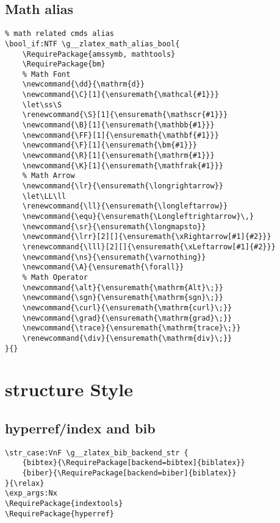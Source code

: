 \subsection{Math alias}
\begin{verbatim}
% math related cmds alias
\bool_if:NTF \g__zlatex_math_alias_bool{
    \RequirePackage{amssymb, mathtools}
    \RequirePackage{bm}          
    % Math Font 
    \newcommand{\dd}{\mathrm{d}}
    \newcommand{\C}[1]{\ensuremath{\mathcal{#1}}}
    \let\ss\S
    \renewcommand{\S}[1]{\ensuremath{\mathscr{#1}}}
    \newcommand{\B}[1]{\ensuremath{\mathbb{#1}}}
    \newcommand{\FF}[1]{\ensuremath{\mathbf{#1}}}
    \newcommand{\F}[1]{\ensuremath{\bm{#1}}}
    \newcommand{\R}[1]{\ensuremath{\mathrm{#1}}}
    \newcommand{\K}[1]{\ensuremath{\mathfrak{#1}}}
    % Math Arrow 
    \newcommand{\lr}{\ensuremath{\longrightarrow}}
    \let\LL\ll
    \renewcommand{\ll}{\ensuremath{\longleftarrow}}
    \newcommand{\equ}{\ensuremath{\Longleftrightarrow}\,}
    \newcommand{\sr}{\ensuremath{\longmapsto}}
    \newcommand{\lrr}[2][]{\ensuremath{\xRightarrow[#1]{#2}}}
    \renewcommand{\lll}[2][]{\ensuremath{\xLeftarrow[#1]{#2}}}
    \newcommand{\ns}{\ensuremath{\varnothing}}
    \newcommand{\A}{\ensuremath{\forall}}
    % Math Operator
    \newcommand{\alt}{\ensuremath{\mathrm{Alt}\;}}
    \newcommand{\sgn}{\ensuremath{\mathrm{sgn}\;}}
    \newcommand{\curl}{\ensuremath{\mathrm{curl}\;}}
    \newcommand{\grad}{\ensuremath{\mathrm{grad}\;}}
    \newcommand{\trace}{\ensuremath{\mathrm{trace}\;}}
    \renewcommand{\div}{\ensuremath{\mathrm{div}\;}}
}{}
\end{verbatim}

\section{structure Style}
\subsection{hyperref/index and bib}
\begin{verbatim}
\str_case:VnF \g__zlatex_bib_backend_str {
    {bibtex}{\RequirePackage[backend=bibtex]{biblatex}}
    {biber}{\RequirePackage[backend=biber]{biblatex}}
}{\relax}
\exp_args:Nx 
\RequirePackage{indextools}
\RequirePackage{hyperref}
\end{verbatim}

